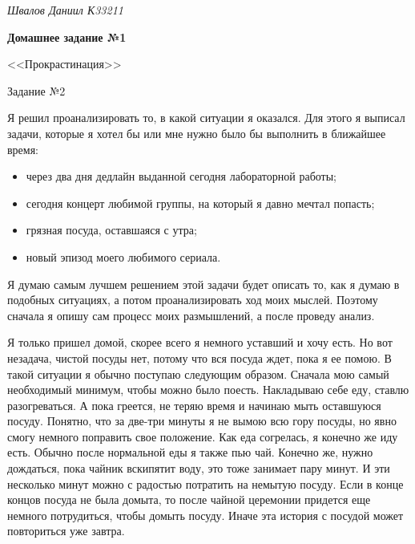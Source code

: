 \documentclass[a4paper, 14pt]{extarticle}
\begin{document}
\begin{flushright}
  \textit{Швалов Даниил К33211}
\end{flushright}

\begin{center}
  \bfseries
  Домашнее задание №1

  <<Прокрастинация>>

  Задание №2
\end{center}

Я решил проанализировать то, в какой ситуации я оказался. Для этого я выписал
задачи, которые я хотел бы или мне нужно было бы выполнить в ближайшее время:
\begin{itemize}
  \item через два дня дедлайн выданной сегодня лабораторной работы;
  \item сегодня концерт любимой группы, на который я давно мечтал попасть;
  \item грязная посуда, оставшаяся с утра;
  \item новый эпизод моего любимого сериала.
\end{itemize}

Я думаю самым лучшем решением этой задачи будет описать то, как я думаю в
подобных ситуациях, а потом проанализировать ход моих мыслей. Поэтому сначала я
опишу сам процесс моих размышлений, а после проведу анализ.

Я только пришел домой, скорее всего я немного уставший и хочу есть. Но вот
незадача, чистой посуды нет, потому что вся посуда ждет, пока я ее помою. В
такой ситуации я обычно поступаю следующим образом. Сначала мою самый
необходимый минимум, чтобы можно было поесть. Накладываю себе еду, ставлю
разогреваться. А пока греется, не теряю время и начинаю мыть оставшуюся посуду.
Понятно, что за две-три минуты я не вымою всю гору посуды, но явно смогу
немного поправить свое положение. Как еда согрелась, я конечно же иду есть.
Обычно после нормальной еды я также пью чай. Конечно же, нужно дождаться, пока
чайник вскипятит воду, это тоже занимает пару минут. И эти несколько минут
можно с радостью потратить на немытую посуду. Если в конце концов посуда не
была домыта, то после чайной церемонии придется еще немного потрудиться, чтобы
домыть посуду. Иначе эта история с посудой может повториться уже завтра.
\end{document}
